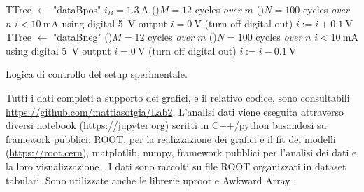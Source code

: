 \documentclass[
    prl,
    reprint, 
    superscriptaddress, 
    altaffilletter, 
    amsmath, 
    amssymb, 
    a4paper,
    varvw]{revtex4-2}
\begin{document}
\begin{algorithm}
    \DontPrintSemicolon
    \CreateMode TTree $\gets$ "dataBpos"\;
    \SetMode $i_B=\SI{1.3}{\ampere}$\;
    \For(){$M=12$ cycles \emph{over} $m$}{
        \For(){$N=100$ cycles \emph{over} $n$}{
            \SetMode $i<\SI{10}{\milli\ampere}$ using digital \SI{5}{\volt} output\;
            \SetMode $i=\SI{0}{\volt}$ (turn off digital out)\;
            \Inc $i:=i+\SI{0.1}{\volt}$
        }
    }
    \;
    \CreateMode TTree $\gets$ "dataBneg"\;
    \For(){$M=12$ cycles \emph{over} $m$}{
        \For(){$N=100$ cycles \emph{over} $n$}{
            \SetMode $i<\SI{10}{\milli\ampere}$ using digital \SI{5}{\volt} output\;
            \SetMode $i=\SI{0}{\volt}$ (turn off digital out)\;
            \Dec $i:=i-\SI{0.1}{\volt}$
        }
    }
    \vspace{0.25cm}
    \caption[]{Logica di controllo del setup sperimentale.}\label{alg:logic}
\end{algorithm}




\begin{code}
    Tutti i dati completi a supporto dei grafici, e il relativo codice, sono consultabili \url{https://github.com/mattiasotgia/Lab2}. L'analisi dati viene eseguita attraverso diversi notebook (\url{https://jupyter.org}) scritti in C++/python basandosi su framework pubblici: ROOT, per la realizzazione dei grafici e il fit dei modelli (\url{https://root.cern}), matplotlib, numpy, framework pubblici per l'analisi dei dati e la loro visualizzazione \cite{Harris:2020ti,Hunter:2007,rene_brun_2019_3895860}. I dati sono raccolti su file ROOT organizzati in dataset tabulari. Sono utilizzate anche le librerie uproot e Awkward Array \cite{pivarski_jim_2018_6522027,jim_pivarski_2022_6540484}.
\end{code}
\end{document}

